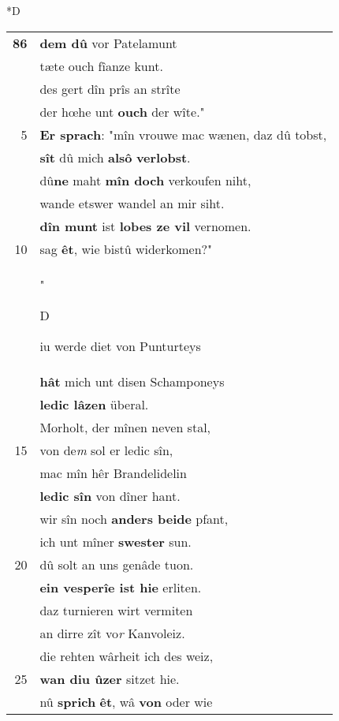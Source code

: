 \documentclass[8pt,a4paper,notitlepage]{article}
\begin{document}
\begin{table}[ht]
\begin{minipage}[t]{0.5\linewidth}
\small
\begin{center}*D
\end{center}
\begin{tabular}{rl}
\textbf{86} & \textbf{dem dû} vor Patelamunt\\ 
 & tæte ouch fîanze kunt.\\ 
 & des gert dîn prîs an strîte\\ 
 & der hœhe unt \textbf{ouch} der wîte."\\ 
5 & \textbf{Er sprach}: "mîn vrouwe mac wænen, daz dû tobst,\\ 
 & \textbf{sît} dû mich \textbf{alsô} \textbf{verlobst}.\\ 
 & dû\textbf{ne} maht \textbf{mîn doch} verkoufen niht,\\ 
 & wande etswer wandel an mir siht.\\ 
 & \textbf{dîn munt} ist \textbf{lobes ze vil} vernomen.\\ 
10 & sag \textbf{êt}, wie bistû widerkomen?"\\ 
 & "\begin{large}D\end{large}iu werde diet von Punturteys\\ 
 & \textbf{hât} mich unt disen Schamponeys\\ 
 & \textbf{ledic lâzen} überal.\\ 
 & Morholt, der mînen neven stal,\\ 
15 & von de\textit{m} sol er ledic sîn,\\ 
 & mac mîn hêr Brandelidelin\\ 
 & \textbf{ledic sîn} von dîner hant.\\ 
 & wir sîn noch \textbf{anders beide} pfant,\\ 
 & ich unt mîner \textbf{swester} sun.\\ 
20 & dû solt an uns genâde tuon.\\ 
 & \textbf{ein vesperîe ist hie} erliten.\\ 
 & daz turnieren wirt vermiten\\ 
 & an dirre zît vo\textit{r} Kanvoleiz.\\ 
 & die rehten wârheit ich des weiz,\\ 
25 & \textbf{wan diu ûzer} sitzet hie.\\ 
 & nû \textbf{sprich} \textbf{êt}, wâ \textbf{von} oder wie\\ 

\end{tabular}
\end{minipage}
\end{table}
\end{document}
